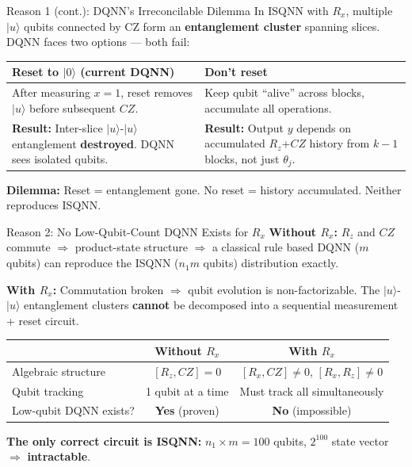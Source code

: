 \documentclass[aspectratio=169]{beamer}
\newcommand{\ket}[1]{\lvert #1\rangle}
\begin{document}
\begin{frame}{Reason 1 (cont.): DQNN's Irreconcilable Dilemma}
  \small
  In ISQNN with $R_x$, multiple $\ket{u}$ qubits connected by CZ form an \textbf{entanglement cluster} spanning slices. DQNN faces two options --- both fail:

  \vspace{0.3em}
  \begin{center}
  \begin{tabular}{p{}|p{}}
    \toprule
    \textbf{Reset to $\ket{0}$} (current DQNN) & \textbf{Don't reset} \\
    \midrule
    After measuring $x=1$, reset removes $\ket{u}$ before subsequent $CZ$. & Keep qubit ``alive'' across blocks, accumulate all operations. \\
    \addlinespace
    \textbf{Result:} Inter-slice $\ket{u}$-$\ket{u}$ entanglement \textbf{destroyed}. DQNN sees isolated qubits. &
    \textbf{Result:} Output $y$ depends on accumulated $R_z$+$CZ$ history from $k-1$ blocks, not just $\theta_j$. \\
    \bottomrule
  \end{tabular}
  \end{center}

  \vspace{0.3em}
  \textbf{Dilemma:} Reset = entanglement gone. No reset = history accumulated. Neither reproduces ISQNN.
\end{frame}

\begin{frame}{Reason 2: No Low-Qubit-Count DQNN Exists for $R_x$}
  \small
  \textbf{Without $R_x$:} $R_z$ and $CZ$ commute $\Rightarrow$ product-state structure $\Rightarrow$ a classical rule based DQNN ($m$ qubits) can reproduce the ISQNN ($n_1m$ qubits) distribution exactly.

  \textbf{With $R_x$:} Commutation broken $\Rightarrow$ qubit evolution is non-factorizable. The $\ket{u}$-$\ket{u}$ entanglement clusters \textbf{cannot} be decomposed into a sequential measurement + reset circuit.

  \vspace{0.3em}
  \begin{center}
  \begin{tabular}{lcc}
    \toprule
    & Without $R_x$ & With $R_x$ \\
    \midrule
    Algebraic structure & $[R_z,CZ]=0$ & $[R_x,CZ]\neq 0$, $[R_x,R_z]\neq 0$ \\
    Qubit tracking & 1 qubit at a time & Must track all simultaneously \\
    Low-qubit DQNN exists? & \textbf{Yes} (proven) & \textbf{No} (impossible) \\
    \bottomrule
  \end{tabular}
  \end{center}

  \vspace{0.3em}
  \textbf{The only correct circuit is ISQNN:} $n_1\times m = 100$ qubits, $2^{100}$ state vector $\Rightarrow$ \textbf{intractable}.
\end{frame}
\end{document}
